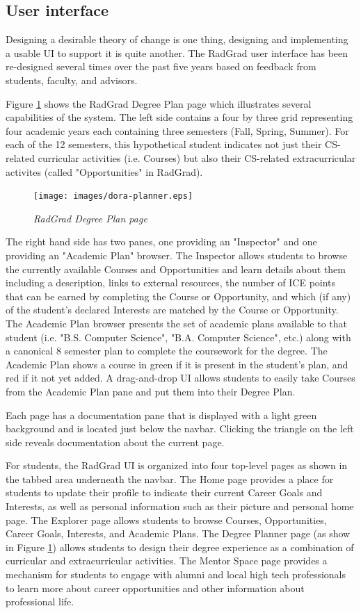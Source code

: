 \documentclass[acmsmall]{acmart}
\begin{document}
\subsection{User interface}

Designing a desirable theory of change is one thing, designing and implementing a usable UI to support it is quite another. The RadGrad user interface has been re-designed several times over the past five years based on feedback from students, faculty, and advisors.

Figure \ref{fig:radgrad} shows the RadGrad Degree Plan page which illustrates several capabilities of the system. The left side contains a four by three grid representing four academic years each containing three semesters (Fall, Spring, Summer).  For each of the 12 semesters, this hypothetical student indicates not just their CS-related curricular activities (i.e. Courses) but also their CS-related extracurricular activites (called "Opportunities" in RadGrad).

\begin{figure}[ht]
\centering
\texttt{[image: images/dora-planner.eps]}
\caption{\em RadGrad Degree Plan page}
\label{fig:radgrad}
\end{figure}

The right hand side has two panes, one providing an "Inspector" and one providing an "Academic Plan" browser. The Inspector allows students to browse the currently available Courses and Opportunities and learn details about them including a description, links to external resources, the number of ICE points that can be earned by completing the Course or Opportunity, and which (if any) of the student's declared Interests are matched by the Course or Opportunity. The Academic Plan browser presents the set of academic plans available to that student (i.e. "B.S. Computer Science", "B.A. Computer Science", etc.) along with a canonical 8 semester plan to complete the coursework for the degree. The Academic Plan shows a course in green if it is present in the student's plan, and red if it not yet added. A drag-and-drop UI allows students to easily take Courses from the Academic Plan pane and put them into their Degree Plan.

Each page has a documentation pane that is displayed with a light green background and is located just below the navbar. Clicking the triangle on the left side reveals documentation about the current page.

For students, the RadGrad UI is organized into four top-level pages as shown in the tabbed area underneath the navbar.  The Home page provides a place for students to update their profile to indicate their current Career Goals and Interests, as well as personal information such as their picture and personal home page.  The Explorer page allows students to browse Courses, Opportunities, Career Goals, Interests, and Academic Plans.  The Degree Planner page (as show in Figure \ref{fig:radgrad}) allows students to design their degree experience as a combination of curricular and extracurricular activities.  The Mentor Space page provides a mechanism for students to engage with alumni and local high tech professionals to learn more about career opportunities and other information about professional life.
\end{document}
